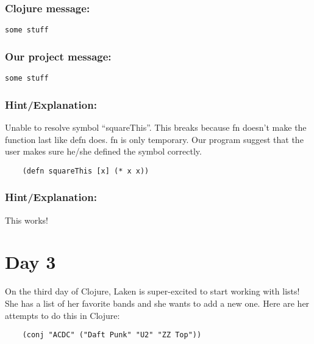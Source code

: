\documentclass[12pt]{article}
\begin{document}
{\addtolength{\leftskip}{10mm}

	\subsubsection*{Clojure message:}
	
	\verb|some stuff|

	\subsubsection*{Our project message:}
	
	\verb|some stuff|
	
	\subsubsection*{Hint/Explanation:}
	
Unable to resolve symbol “squareThis”. This breaks because fn doesn’t make the function last like defn does. fn is only temporary. Our program suggest that the user makes sure he/she defined the symbol correctly.

}

\begin{verbatim}
	(defn squareThis [x] (* x x))
\end{verbatim}

{\addtolength{\leftskip}{10mm}
	
	\subsubsection*{Hint/Explanation:}
	
	This works!
	
}

\section{Day 3}
On the third day of Clojure, Laken is super-excited to start working with lists! She has a list of her favorite bands and she wants to add a new one. Here are her attempts to do this in Clojure:

\begin{verbatim}
	(conj "ACDC" ("Daft Punk" "U2" "ZZ Top"))
\end{verbatim}
\end{document}
